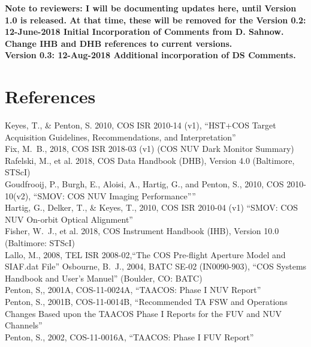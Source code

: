 \documentclass{stsci_report}
\begin{document}
{\bf Note to reviewers: I will be documenting updates here, until Version 1.0 is released. At that time, these will be removed for the
Version 0.2: 12-June-2018 Initial Incorporation of Comments from D. Sahnow.\\
	 			Change IHB and DHB references to current versions.\\
Version 0.3: 12-Aug-2018  Additional incorporation of DS Comments.\\
\clearpage
\section{References}\label{sec:References}
\vspace{0.1cm}
\small
Keyes, T., \& Penton, S. 2010, COS ISR 2010-14 (v1), ``HST+COS Target Acquisition Guidelines, Recommendations, and Interpretation''\\
Fix, M.~B., 2018, COS ISR 2018-03 (v1) (COS NUV Dark Monitor Summary)\\
Rafelski, M., et al. 2018, COS Data Handbook (DHB), Version 4.0 (Baltimore, STScI)\\
Goudfrooij, P., Burgh, E., Aloisi, A., Hartig, G., and Penton, S., 2010, COS 2010-10(v2), ``SMOV: COS NUV Imaging Performance''''\\
Hartig, G., Delker, T., \& Keyes, T., 2010, COS ISR 2010-04 (v1) ``SMOV: COS NUV On-orbit Optical Alignment''\\
Fisher, W.~J., et al. 2018, COS Instrument Handbook (IHB), Version 10.0 (Baltimore: STScI)\\
Lallo, M., 2008, TEL ISR 2008-02,``The COS Pre-flight Aperture Model and SIAF.dat File''
Osbourne, B.~J., 2004, BATC SE-02 (IN0090-903), ``COS Systems Handbook and User's Manuel'' (Boulder, CO: BATC)\\
Penton, S,, 2001A, COS-11-0024A, ``TAACOS: Phase I NUV Report''\\
Penton, S., 2001B, COS-11-0014B, ``Recommended TA FSW and Operations Changes Based upon the TAACOS Phase I Reports for the FUV and NUV Channels''\\
Penton, S., 2002, COS-11-0016A, ``TAACOS: Phase I FUV Report''\\
}
\end{document}
